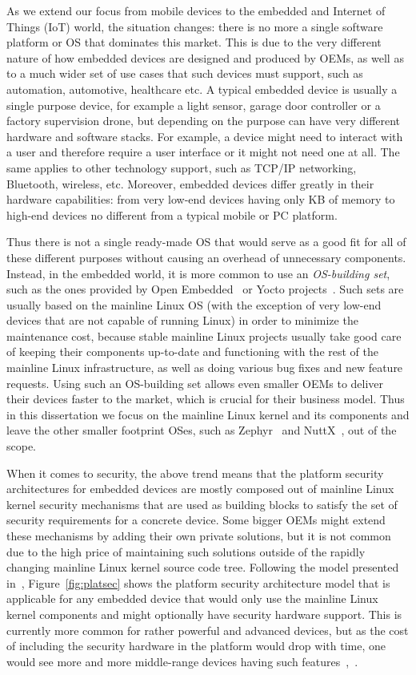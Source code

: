 As we extend our focus from mobile devices to the embedded and Internet of Things (IoT) world, the situation changes: there is no more a single software platform or OS that dominates this market. This is due to the very different nature of how embedded devices are designed and produced by OEMs, as well as to a much wider set of use cases that such devices must support, such as automation, automotive, healthcare etc. A typical embedded device is usually a single purpose device, for example a light sensor, garage door controller or a factory supervision drone, but depending on the purpose can have very different hardware and software stacks. For example, a device might need to interact with a user and therefore require a user interface or it might not need one at all. The same applies to other technology support, such as TCP/IP networking, Bluetooth, wireless, etc. Moreover, embedded devices differ greatly in their hardware capabilities: from very low-end devices having only KB of memory to high-end devices no different from a typical mobile or PC platform.

Thus there is not a single ready-made OS that would serve as a good fit for all of these different purposes without causing an overhead of unnecessary components. Instead, in the embedded world, it is more common to use an \textit{OS-building set}, such as the ones provided by Open Embedded~\cite{OE2017} or Yocto projects~\cite{yocto2017}. Such sets are usually based on the mainline Linux OS (with the exception of very low-end devices that are not capable of running Linux) in order to minimize the maintenance cost, because stable mainline Linux projects usually take good care of keeping their components up-to-date and functioning with the rest of the mainline Linux infrastructure, as well as doing various bug fixes and new feature requests. Using such an OS-building set allows even smaller OEMs to deliver their devices faster to the market, which is crucial for their business model. Thus in this dissertation we focus on the mainline Linux kernel and its components and leave the other smaller footprint OSes, such as Zephyr~\cite{zephyr} and NuttX~\cite{NuttX}, out of the scope. 

When it comes to security, the above trend means that the platform security architectures for embedded devices are mostly composed out of mainline Linux kernel security mechanisms that are used as building blocks to satisfy the set of security requirements for a concrete device. Some bigger OEMs might extend these mechanisms by adding their own private solutions, but it is not common due to the high price of maintaining such solutions outside of the rapidly changing mainline Linux kernel source code tree. Following the model presented in~\cite{2013Asokan}, Figure~\ref{fig:platsec} shows the platform security architecture model that is applicable for any embedded device that would only use the mainline Linux kernel components and might optionally have security hardware support. This is currently more common for rather powerful and advanced devices, but as the cost of including the security hardware in the platform would drop with time, one would see more and more middle-range devices having such features~\cite{marketresearch},~\cite{iothwsecurity}. 


